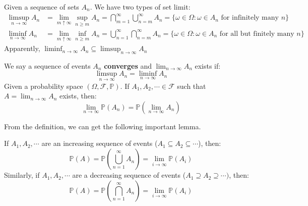 \documentclass{huhtakm-template-book}
\newcommand{\prob}{\mathbb{P}}
\begin{document}
    \begin{rem} 
    Given a sequence of sets $A_{n}$. We have two types of set limit:
        \begin{align*}
            \limsup_{n\to\infty}A_{n}&=\lim_{m\uparrow\infty}\sup_{n\geq m}A_{n}=\bigcap_{m=1}^{\infty}\bigcup_{n=m}^{\infty}A_{n}=\{\omega\in\Omega:\omega\in A_{n}\text{ for infinitely many }n\}\\
            \liminf_{n\to\infty}A_{n}&=\lim_{m\uparrow\infty}\inf_{n\geq m}A_{n}=\bigcup_{n=1}^{\infty}\bigcap_{n=m}^{\infty}A_{n}=\{\omega\in\Omega: \omega\in A_{n}\text{ for all but finitely many }n\}
        \end{align*}
        Apparently, $\liminf_{n\to\infty}A_{n}\subseteq\limsup_{n\to\infty}A_{n}$
    \end{rem}
    \begin{defn}
        We say a sequence of events $A_{n}$ \textbf{converges} and $\lim_{n\to\infty}A_{n}$ exists if:
        \begin{equation*}
            \limsup_{n\to\infty}A_{n}=\liminf_{n\to\infty}A_{n}
        \end{equation*}
        Given a probability space $(\Omega,\mathcal{F},\prob)$. If $A_{1},A_{2},\cdots\in\mathcal{F}$ such that $A=\lim_{n\to\infty}A_{n}$ exists, then:
        \begin{equation*}
            \lim_{n\to\infty}\prob(A_{n})=\prob\left(\lim_{n\to\infty}A_{n}\right)
        \end{equation*}
    \end{defn}
    From the definition, we can get the following important lemma.
    \begin{lem}
    \label{Continuous probability}
        If $A_{1},A_{2},\cdots$ are an increasing sequence of events ($A_{1}\subseteq A_{2}\subseteq\cdots$), then:
        \begin{equation*}
            \prob(A)=\prob\left(\bigcup_{n=1}^{\infty}A_{n}\right)=\lim_{i\to\infty}\prob(A_{i})
        \end{equation*}
        Similarly, if $A_{1},A_{2},\cdots$ are a decreasing sequence of events ($A_{1}\supseteq A_{2}\supseteq\cdots)$, then:
        \begin{equation*}
            \prob(A)=\prob\left(\bigcap_{n=1}^{\infty}A_{n}\right)=\lim_{i\to\infty}\prob(A_{i})
        \end{equation*}
    \end{lem}
\end{document}
